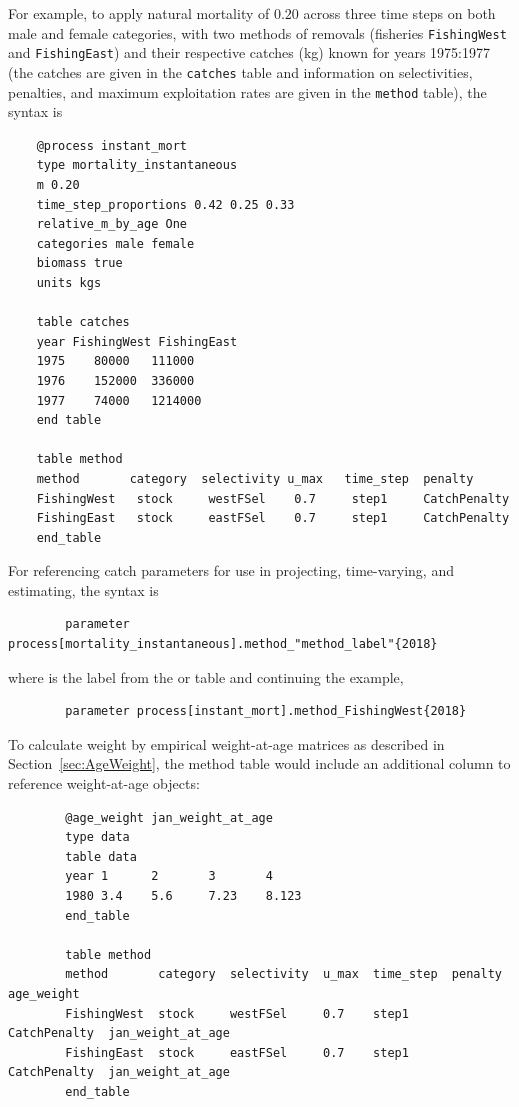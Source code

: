 For example, to apply natural mortality of $0.20$ across three time steps on both male and female categories, with two methods of removals (fisheries \texttt{FishingWest} and \texttt{FishingEast}) and their respective catches (kg) known for years 1975:1977 (the catches are given in the \texttt{catches} table and information on selectivities, penalties, and maximum exploitation rates are given in the \texttt{method} table), the syntax is

{\small{\begin{verbatim}
	@process instant_mort
	type mortality_instantaneous
	m 0.20
	time_step_proportions 0.42 0.25 0.33
	relative_m_by_age One
	categories male female
	biomass true
	units kgs

	table catches
	year FishingWest FishingEast
	1975	80000	111000
	1976	152000	336000
	1977	74000	1214000
	end table

	table method
	method       category  selectivity u_max   time_step  penalty
	FishingWest   stock     westFSel    0.7     step1     CatchPenalty
	FishingEast   stock     eastFSel    0.7     step1     CatchPenalty
	end_table
	\end{verbatim}}}

For referencing catch parameters for use in projecting, time-varying, and estimating, the syntax is

{\small{\begin{verbatim}
		parameter process[mortality_instantaneous].method_"method_label"{2018}
\end{verbatim}}}

where  is the label from the  or  table and continuing the example,

{\small{\begin{verbatim}
		parameter process[instant_mort].method_FishingWest{2018}
\end{verbatim}}}

To calculate weight by empirical weight-at-age matrices as described in Section~\ref{sec:AgeWeight}, the method table would include an additional column to reference weight-at-age objects:

{\small{\begin{verbatim}
		@age_weight jan_weight_at_age
		type data
		table data
		year 1 		2 		3 		4
		1980 3.4	5.6		7.23 	8.123
		end_table

		table method
		method       category  selectivity  u_max  time_step  penalty       age_weight
		FishingWest  stock     westFSel     0.7    step1      CatchPenalty  jan_weight_at_age
		FishingEast  stock     eastFSel     0.7    step1      CatchPenalty  jan_weight_at_age
		end_table
\end{verbatim}}}



